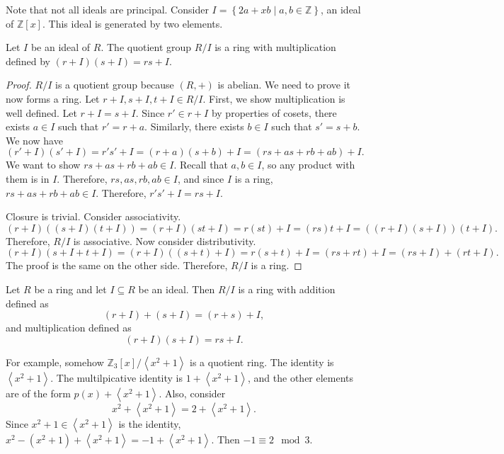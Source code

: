 Note that not all ideals are principal. Consider $I=\left\{ 2a+xb \mid a,b\in\mathbb{Z} \right\} $, an ideal of $\mathbb{Z}[x]$. This ideal is generated by two elements.
\begin{theorem}\label{thm:bwaaa}
	Let $I$ be an ideal of $R$. The quotient group $R /I$ is a ring with multiplication defined by $\left( r+I \right) \left( s+I \right) =rs+I$.
\end{theorem}
\begin{proof}
	$R /I$ is a quotient group because $(R,+)$ is abelian. We need to prove it now forms a ring. Let $r+I,s+I,t+I\in R /I$. First, we show multiplication is well defined. Let $r+I=s+I$. Since $r'\in r+I$ by properties of cosets, there exists $a\in I$ such that $r'=r+a$. Similarly, there exists $b\in I$ such that $s'=s+b$. We now have
	\[
		\left( r'+I \right) \left( s'+I \right) =r's'+I=\left( r+a \right) \left( s+b \right) +I=(rs+as+rb+ab)+I
	.\]
	We want to show $rs+as+rb+ab\in I$. Recall that $a,b\in I$, so any product with them is in $I$. Therefore, $rs,as,rb,ab\in I$, and since $I$ is a ring, $rs+as+rb+ab\in I$. Therefore, $r's'+I =rs+I$.

	Closure is trivial. Consider associativity.
	\[
		\left( r+I \right) \left( \left( s+I \right) \left( t+I \right)  \right) =\left( r+I \right) \left( st+I \right) =r(st)+I=(rs)t+I=\left( \left( r+I \right) \left( s+I \right)  \right) \left( t+I \right) 
	.\]
	Therefore, $R /I$ is associative. Now consider distributivity.
	\[
		\left( r+I \right) \left( s+I+t+I \right) =\left( r+I \right) \left( (s+t)+I \right) =r(s+t)+I=\left( rs+rt \right) +I=\left( rs+I \right) +\left( rt+I \right) 
	.\]
	The proof is the same on the other side. Therefore, $R /I$ is a ring.
\end{proof}
\begin{definition}\label{dfn:QR}
	Let $R$ be a ring and let $I\subseteq R$ be an ideal. Then $R  /I$ is a ring with addition defined as
	\[
		\left( r+I \right) +\left( s+I \right) =\left( r+s \right) +I
	,\]
	and multiplication defined as
	\[
		\left( r+I \right) \left( s+I \right) =rs+I
	.\]
\end{definition}

For example, somehow $\mathbb{Z}_3[x] / \left\langle x^2+1 \right\rangle $ is a quotient ring. The identity is $\left\langle x^2+1 \right\rangle $. The multilpicative identity is $1+\left\langle x^2+1 \right\rangle $, and the other elements are of the form $p(x)+\left\langle x^2+1 \right\rangle  $. Also, consider
\[
	x^2+\left\langle x^2+1 \right\rangle =2+\left\langle x^2+1 \right\rangle 
.\]
Since $x^2+1\in \left\langle x^2+1 \right\rangle $ is the identity, $x^2-\left( x^2+1 \right) +\left\langle x^2+1 \right\rangle =-1+\left\langle x^2+1 \right\rangle $. Then $-1\equiv 2\mod{3}$.
